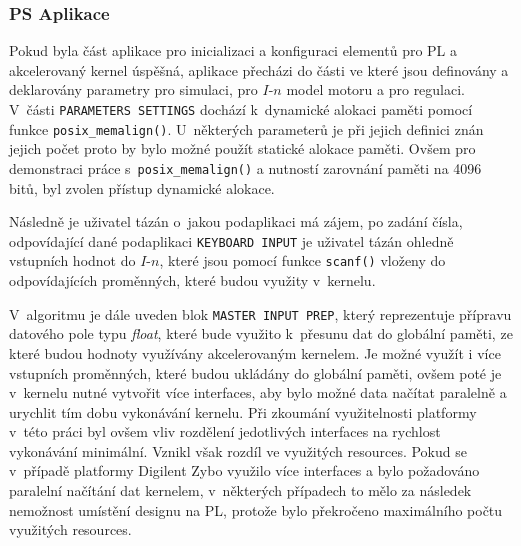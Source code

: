 \documentclass[a4paper, twoside, 11pt]{article}
\begin{document}
		\subsubsection{PS Aplikace}
			Pokud byla část aplikace pro inicializaci a konfiguraci elementů pro PL a akcelerovaný kernel úspěšná, aplikace přecházi do části ve které jsou definovány a deklarovány parametry pro simulaci, pro $I$-$n$ model motoru a pro regulaci. V~části \texttt{PARAMETERS SETTINGS} dochází k~dynamické alokaci paměti pomocí funkce \texttt{posix\_memalign()}. U~některých parameterů je při jejich definici znán jejich počet proto by bylo možné použít statické alokace paměti. Ovšem pro demonstraci práce s~\texttt{posix\_memalign()} a nutností zarovnání paměti na 4096 bitů, byl zvolen přístup dynamické alokace.\par
			Následně je uživatel tázán o~jakou podaplikaci má zájem, po zadání čísla, odpovídající dané podaplikaci \texttt{KEYBOARD INPUT} je uživatel tázán ohledně vstupních hodnot do $I$-$n$, které jsou pomocí funkce \texttt{scanf()} vloženy do odpovídajících proměnných, které budou využity v~kernelu.\par
			V~algoritmu je dále uveden blok \texttt{MASTER INPUT PREP}, který reprezentuje přípravu datového pole typu \textit{float}, které bude využito k~přesunu dat do globální paměti, ze které budou hodnoty využívány akcelerovaným kernelem. Je možné využít i více vstupních proměnných, které budou ukládány do globální paměti, ovšem poté je v~kernelu nutné vytvořit více interfaces, aby bylo možné data načítat paralelně a urychlit tím dobu vykonávání kernelu. Při zkoumání využitelnosti platformy v~této práci byl ovšem vliv rozdělení jedotlivých interfaces na rychlost vykonávání minimální. Vznikl však rozdíl ve využitých resources. Pokud se v~případě platformy Digilent Zybo využilo více interfaces a bylo požadováno paralelní načítání dat kernelem, v~některých případech to mělo za následek nemožnost umístění designu na PL, protože bylo překročeno maximálního počtu využitých resources.\par
			\
\end{document}
